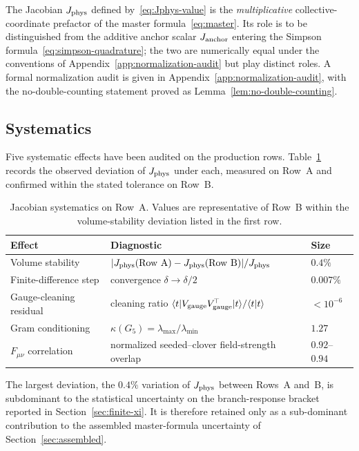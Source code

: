 \documentclass[a4paper,11pt]{article}
\theoremstyle{definition}
\newcommand{\Jphys}{J_{\rm phys}}
\begin{document}
The Jacobian $\Jphys$ defined by~\eqref{eq:Jphys-value} is the \emph{multiplicative} collective-coordinate prefactor of the master formula~\eqref{eq:master}. Its role is to be distinguished from the additive anchor scalar $J_{\rm anchor}$ entering the Simpson formula~\eqref{eq:simpson-quadrature}; the two are numerically equal under the conventions of Appendix~\ref{app:normalization-audit} but play distinct roles. A formal normalization audit is given in Appendix~\ref{app:normalization-audit}, with the no-double-counting statement proved as Lemma~\ref{lem:no-double-counting}.


\subsection{Systematics}
\label{subsec:jacobian-systematics}

Five systematic effects have been audited on the production rows.
Table~\ref{tab:jacobian-systematics} records the observed deviation of
$\Jphys$ under each, measured on Row~A and confirmed within the
stated tolerance on Row~B.

\begin{table}[h]
\centering
\begin{tabular}{lll}
\toprule
Effect & Diagnostic & Size \\
\midrule
Volume stability
  & $|\Jphys(\text{Row A}) - \Jphys(\text{Row B})|/\Jphys$
  & $0.4\%$ \\
Finite-difference step
  & convergence $\delta \to \delta/2$
  & $0.007\%$ \\
Gauge-cleaning residual
  & cleaning ratio
    $\langle t|V_{\rm gauge}V_{\rm gauge}^{\!\top}|t\rangle
     / \langle t|t\rangle$
  & $< 10^{-6}$ \\
Gram conditioning
  & $\kappa(G_5) = \lambda_{\max}/\lambda_{\min}$
  & $1.27$ \\
$F_{\mu\nu}$ correlation
  & normalized seeded--clover field-strength overlap
  & $0.92$--$0.94$ \\
\bottomrule
\end{tabular}
\caption{Jacobian systematics on Row~A. Values are representative of
Row~B within the volume-stability deviation listed in the first row.}
\label{tab:jacobian-systematics}
\end{table}

The largest deviation, the $0.4\%$ variation of $\Jphys$ between
Rows~A and~B, is subdominant to the statistical uncertainty on the
branch-response bracket reported in
Section~\ref{sec:finite-xi}. It is therefore retained only as a
sub-dominant contribution to the assembled master-formula uncertainty
of Section~\ref{sec:assembled}.
\end{document}
